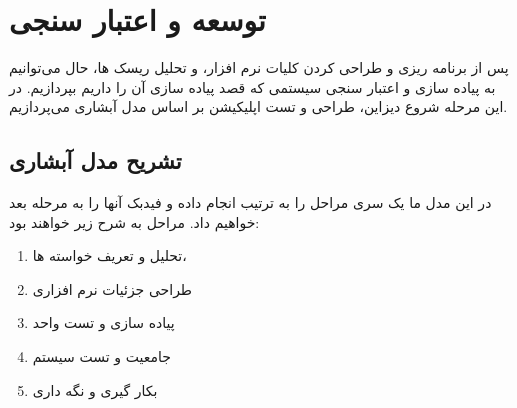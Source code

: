 \newpage

\section{توسعه و اعتبار سنجی}
پس از برنامه ریزی و طراحی کردن کلیات نرم افزار، و تحلیل ریسک ها، حال می‌توانیم به پیاده سازی و اعتبار سنجی سیستمی که قصد پیاده سازی آن را داریم بپردازیم.
در این مرحله شروع دیزاین، طراحی و تست اپلیکیشن بر اساس مدل آبشاری می‌پردازیم.

\subsection{تشریح مدل آبشاری}
در این مدل ما یک سری مراحل را به ترتیب انجام داده و فیدبک آنها را به مرحله بعد خواهیم داد. مراحل به شرح زیر خواهند بود:

\begin{enumerate}
	\item تحلیل و تعریف خواسته ها،
	\item طراحی جزئیات نرم افزاری
	\item پیاده سازی و تست واحد
	\item جامعیت و تست سیستم
	\item بکار گیری و نگه داری
\end{enumerate}

\newpage
